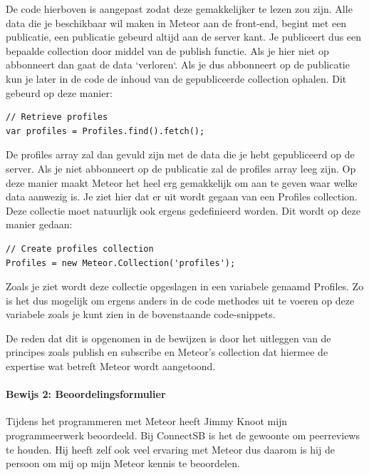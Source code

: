 De code hierboven is aangepast zodat deze gemakkelijker te lezen zou zijn. Alle data die je beschikbaar wil maken in Meteor aan de front-end, begint met een publicatie, een publicatie gebeurd altijd aan de server kant. Je publiceert dus een bepaalde \gls{collection} door middel van de publish functie. Als je hier niet op abbonneert dan gaat de data `verloren`. Als je dus abbonneert op de publicatie kun je later in de code de inhoud van de gepubliceerde \gls{collection} ophalen. Dit gebeurd op deze manier:

\begin{lstlisting}[caption=Profielen ophalen]
// Retrieve profiles
var profiles = Profiles.find().fetch();
\end{lstlisting}

De profiles array zal dan gevuld zijn met de data die je hebt gepubliceerd op de server. Als je niet abbonneert op de publicatie zal de profiles array leeg zijn. Op deze manier maakt Meteor het heel erg gemakkelijk om aan te geven waar welke data aanwezig is. Je ziet hier dat er uit wordt gegaan van een Profiles \gls{collection}. Deze collectie moet natuurlijk ook ergens gedefinieerd worden. Dit wordt op deze manier gedaan:

\begin{lstlisting}[caption=Profielen collectie aanmaken]
// Create profiles collection
Profiles = new Meteor.Collection('profiles');
\end{lstlisting}

Zoals je ziet wordt deze collectie opgeslagen in een variabele genaamd Profiles. Zo is het dus mogelijk om ergens anders in de code methodes uit te voeren op deze variabele zoals je kunt zien in de bovenstaande code-snippets.

De reden dat dit is opgenomen in de bewijzen is door het uitleggen van de principes zoals publish en subscribe en Meteor's collection dat hiermee de expertise wat betreft Meteor wordt aangetoond.
\paragraph{Bewijs 2: Beoordelingsformulier}
Tijdens het programmeren met Meteor heeft Jimmy Knoot mijn programmeerwerk beoordeeld. Bij ConnectSB is het de gewoonte om \gls{peerreviews} te houden. Hij heeft zelf ook veel ervaring met Meteor dus daarom is hij de persoon om mij op mijn Meteor kennis te beoordelen.


